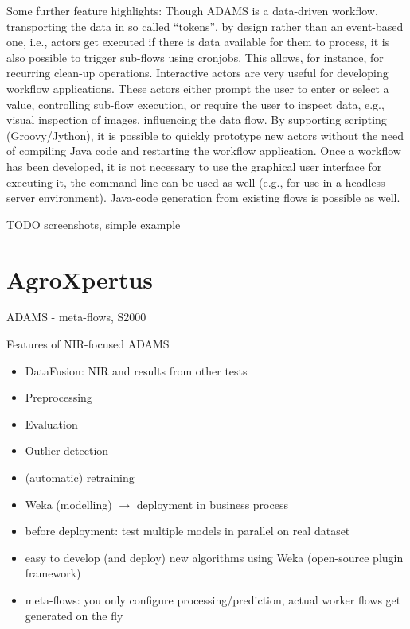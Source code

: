 \documentclass{llncs}
\begin{document}
Some further feature highlights: Though ADAMS is a data-driven workflow,
transporting the data in so called “tokens”, by design rather than an
event-based one, i.e., actors get executed if there is data available for them
to process, it is also possible to trigger sub-flows using cronjobs.  This
allows, for instance, for recurring clean-up operations. Interactive actors are
very useful for developing workflow applications. These actors either prompt
the user to enter or select a value, controlling sub-flow execution, or require
the user to inspect data, e.g., visual inspection of images, influencing the
data flow. By supporting scripting (Groovy/Jython), it is possible to quickly
prototype new actors without the need of compiling Java code and restarting the
workflow application.  Once a workflow has been developed, it is not necessary
to use the graphical user interface for executing it, the command-line can be
used as well (e.g., for use in a headless server environment). Java-code
generation from existing flows is possible as well.

TODO screenshots, simple example


\section{AgroXpertus}
ADAMS - meta-flows, S2000

Features of NIR-focused ADAMS
\begin{itemize}
  \item DataFusion: NIR and results from other tests
  \item Preprocessing
  \item Evaluation
  \item Outlier detection
  \item (automatic) retraining
  \item Weka (modelling) $\rightarrow$ deployment in business process
  \item before deployment: test multiple models in parallel on real dataset
  \item easy to develop (and deploy) new algorithms using Weka (open-source plugin framework)
  \item meta-flows: you only configure processing/prediction, actual worker flows get generated on the fly
\end{itemize}


\end{document}
